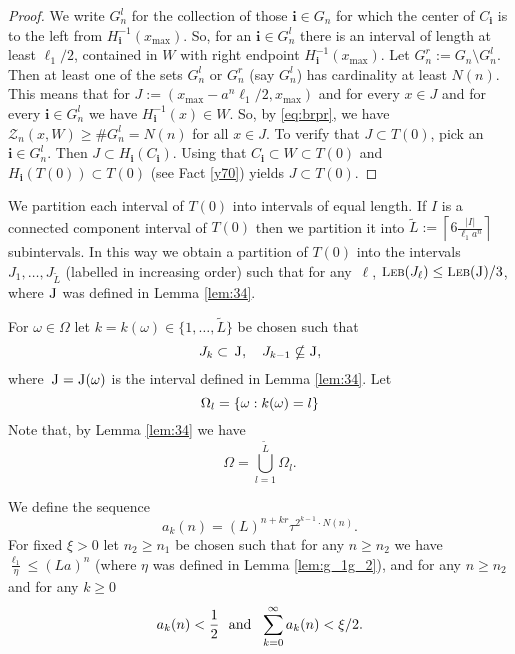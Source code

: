 \documentclass[amssymb,amsfonts,12pt,verbatim,righttag,oneside]{amsart}
\numberwithin{equation}{section} %
\theoremstyle{plain}
\newcommand*{\clrred}[1]{{\color{red} #1}}
\newcommand{\fm}{\ensuremath{\clrred{}}}
\newcommand{\fma}{\ensuremath{\,}}
\newcommand{\Leb}{{\small \textsc{Leb}}}
\newcommand*{\J}{\ensuremath{\textsc{J}}}
\newcommand*{\xm}{\ensuremath{x_{\max}}}
\theoremstyle{plain}
\begin{document}
\begin{proof}
We write $G _{n}^{l }$  for the collection of those $\mathbf{i}\in G_n$ for which the center of $C_{\mathbf{i}}$ is to the left  from $H_{\mathbf{i}}^{-1}(\xm)$.
So, for an $\mathbf{i}\in G _{n}^{l }$ there is an interval of length at least $\ell _1/2$, contained in $W$ with right endpoint $H_{\mathbf{i}}^{-1}(\xm)$.
Let $G _{n}^{r}:= G_n\setminus G _{n}^{l}$. Then at least one of the sets $G _{n}^{l}$ or $G _{n}^{r}$ (say $G _{n}^{l  }$) has cardinality at least $N(n)$.
This means that for  $J:=\left(\xm-a^n\ell_1/2 , \xm \right)$ and for every $x\in J$ and for every $\mathbf{i}\in  G _{n}^{l  }$ we have
$H _{\mathbf{i}}^{-1}(x)\in W$. So, by \eqref{eq:brpr}, we have  $\mathcal{Z}_n(x,W)\geq \# G _{n}^{l  }=N(n)$ for all $x\in J$.
To verify that $J\subset T(0)$,  pick an  $\mathbf{i}\in G _{n}^{l }$. Then $J\subset H_{\mathbf{i}}(C_{\mathbf{i}})$.
Using that  $C_{\mathbf{i}}\subset W\subset T(0)$ and $H_{\mathbf{i}}(T(0))\subset  T(0)$ (see Fact \ref{y70}) yields $J\subset  T(0)$.
\end{proof}


We partition each interval of $T(0)$ into intervals of equal length. If $I$ is a connected component interval of
$T(0)$ then we partition it into $  {\widetilde{L}:=}\left\lceil 6\frac{|I|}{\ell_1a^{n}}\right\rceil$ subintervals.
In this way we obtain a partition of $T(0)$ into the intervals  $J_1,\dots,J_{\widetilde{L}}$ (labelled in increasing order)
such that for any \fma $\ell$,  $\Leb(J_{\ell}) \leq \Leb(\J)/3$, where $\J$ was defined in Lemma \ref{lem:34}.

For $\omega\in\Omega$  let $k=k(\omega )\in\{1,\dots,\widetilde{L}\}$ be chosen such that
\begin{equation*}
J_{k}\subset \fma \J,\quad J_{k-1}\nsubseteq \J,
\end{equation*}
where \fma $\J=\J(\omega )$ is the interval defined in Lemma \ref{lem:34}. Let
\begin{equation*}
\Omega_l=\{\omega: \fm k(\omega)=l\}
\end{equation*}
Note that, by Lemma \ref{lem:34} we have
\begin{equation*}
 \Omega=\bigcup_{l=1}^{\widetilde{L}}\Omega_l.
\end{equation*}

We define the sequence
\begin{equation*}
 a_k(n)=(L)^{n+kr}\tau^{2^{k-1}\cdot N(n)}.
\end{equation*}
For fixed $\xi>0$ let $n_2\geq n_1$ be chosen such that for any $n\geq n_2$ we have $\frac{\ell _1}{\eta } \leq (La)^n$ (where $\eta $ was defined in Lemma \ref{lem:g_1g_2}),
 and for any $n\geq n_2$ and for any $k\geq 0$
\begin{equation}\label{a99}
 a_k(n)<\frac{1}{2}\ \hbox{ and }\ \sum_{k=0}^\infty a_k(n)<\xi/2.
\end{equation}
\end{document}
